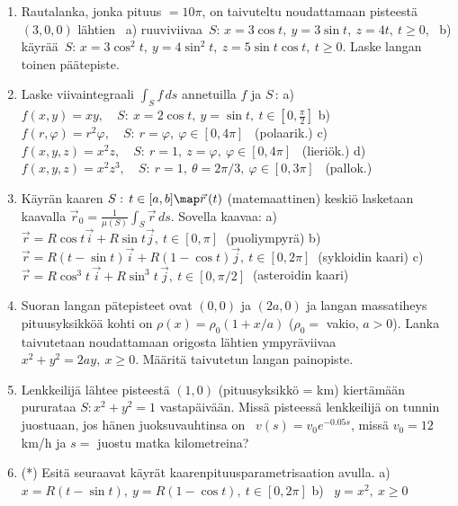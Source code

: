 \Harj
\begin{enumerate}

\item
Rautalanka, jonka pituus $=10\pi$, on taivuteltu noudattamaan pisteestä $(3,0,0)$ lähtien \
a) ruuviviivaa $\,S:\, x=3\cos t,\ y=3\sin t,\ z=4t,\ t \ge 0$, \ b) käyrää
$\,S:\, x=3\cos^2t,\ y=4\sin^2t,\ z=5\sin t\cos t,\ t \ge 0$. Laske langan toinen päätepiste.

\item
Laske viivaintegraali $\int_S f\,ds$ annetuilla $f$ ja $S$\,: \vspace{1mm}\newline
a) \ $f(x,y)=xy, \quad S:\ x=2\cos t,\ y=\sin t,\ t\in[0,\frac{\pi}{2}]$ \newline
b) \ $f(r,\varphi)=r^2\varphi, \quad S:\ r=\varphi,\ \varphi\in[0,4\pi]$ \ (polaarik.) \newline
c) \ $f(x,y,z)=x^2z, \quad S:\ r=1,\ z=\varphi,\ \varphi\in[0,4\pi]$ \ (lieriök.) \newline
d) \ $f(x,y,z)=x^2z^3, \quad S:\ r=1,\ \theta=2\pi/3,\ \varphi\in[0,3\pi]$ \ (pallok.)

\item
Käyrän kaaren $S:\,t\in[a,b]\map\vec r\,(t)$ (matemaattinen) keskiö lasketaan kaavalla
$\vec r_0 = \frac{1}{\mu(S)} \int_S \vec r\,ds$. Sovella kaavaa: \vspace{1mm}\newline
a) \ $\vec r=R\cos t\vec i+R\sin t\vec j,\ t\in[0,\pi]\ $ (puoliympyrä) \newline
b) \ $\vec r=R(t-\sin t)\vec i+R(1-\cos t)\vec j,\ t\in[0,2\pi]\ $ (sykloidin kaari) \newline
c) \ $\vec r=R\cos^3 t\,\vec i+R\sin^3 t\,\vec j,\ t\in[0,\pi/2]\ $ (asteroidin kaari)

\item
Suoran langan pätepisteet ovat $(0,0)$ ja $(2a,0)$ ja langan massatiheys pituusyksikköä kohti
on $\rho(x)=\rho_0(1+x/a)$ ($\rho_0=$ vakio, $a>0$). Lanka taivutetaan noudattamaan origosta
lähtien ympyräviivaa $x^2+y^2=2ay,\ x \ge 0$. Määritä taivutetun langan painopiste.

\item
Lenkkeilijä lähtee pisteestä $(1,0)$ (pituusyksikkö = km) kiertämään pururataa $S: x^2+y^2=1$
vastapäivään. Missä pisteessä lenkkeilijä on tunnin juostuaan, jos hänen juoksuvauhtinsa on \ 
$v(s)=v_0e^{-0.05s}$, missä $v_0=12$ km/h ja $s=$ juostu matka kilometreina?

\item (*)
Esitä seuraavat käyrät kaarenpituusparametrisaation avulla. \vspace{1mm}\newline
a) \ $x=R(t-\sin t),\ y=R(1-\cos t),\ t\in[0,2\pi]$ \newline
b) \ $y=x^2,\ x \ge 0$


\end{enumerate}
